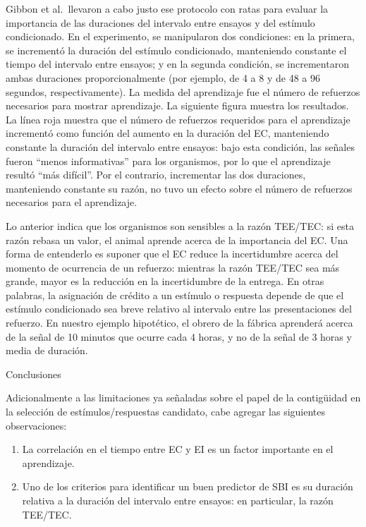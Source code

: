 \documentclass[
  letterpaper,
]{book}
\begin{document}
Gibbon et al.~llevaron a cabo justo ese protocolo con ratas para evaluar
la importancia de las duraciones del intervalo entre ensayos y del
estímulo condicionado. En el experimento, se manipularon dos
condiciones: en la primera, se incrementó la duración del estímulo
condicionado, manteniendo constante el tiempo del intervalo entre
ensayos; y en la segunda condición, se incrementaron ambas duraciones
proporcionalmente (por ejemplo, de 4 a 8 y de 48 a 96 segundos,
respectivamente). La medida del aprendizaje fue el número de refuerzos
necesarios para mostrar aprendizaje. La siguiente figura muestra los
resultados. La línea roja muestra que el número de refuerzos requeridos
para el aprendizaje incrementó como función del aumento en la duración
del EC, manteniendo constante la duración del intervalo entre ensayos:
bajo esta condición, las señales fueron ``menos informativas'' para los
organismos, por lo que el aprendizaje resultó ``más difícil''. Por el
contrario, incrementar las dos duraciones, manteniendo constante su
razón, no tuvo un efecto sobre el número de refuerzos necesarios para el
aprendizaje.

Lo anterior indica que los organismos son sensibles a la razón TEE/TEC:
si esta razón rebasa un valor, el animal aprende acerca de la
importancia del EC. Una forma de entenderlo es suponer que el EC reduce
la incertidumbre acerca del momento de ocurrencia de un refuerzo:
mientras la razón TEE/TEC sea más grande, mayor es la reducción en la
incertidumbre de la entrega. En otras palabras, la asignación de crédito
a un estímulo o respuesta depende de que el estímulo condicionado sea
breve relativo al intervalo entre las presentaciones del refuerzo. En
nuestro ejemplo hipotético, el obrero de la fábrica aprenderá acerca de
la señal de 10 minutos que ocurre cada 4 horas, y no de la señal de 3
horas y media de duración.

Conclusiones

Adicionalmente a las limitaciones ya señaladas sobre el papel de la
contigüidad en la selección de estímulos/respuestas candidato, cabe
agregar las siguientes observaciones:

\begin{enumerate}
\def\labelenumi{\arabic{enumi}.}
\item
  La correlación en el tiempo entre EC y EI es un factor importante en
  el aprendizaje.
\item
  Uno de los criterios para identificar un buen predictor de SBI es su
  duración relativa a la duración del intervalo entre ensayos: en
  particular, la razón TEE/TEC.
\end{enumerate}
\end{document}
